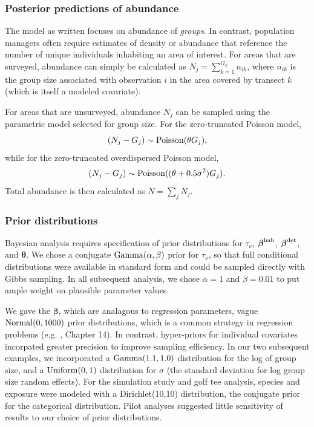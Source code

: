 \documentclass[10pt]{article}
\begin{document}
\subsubsection*{Posterior predictions of abundance}

The model as written focuses on abundance of \emph{groups}.  In contrast, population managers often require estimates of density or abundance that reference the number of unique individuals inhabiting an area of interest.  For areas that are surveyed, abundance can simply be calculated as $N_j=\sum_{k=1}^{G_k} n_{ik}$, where $n_{ik}$ is the group size associated with observation $i$ in the area covered by transect $k$ (which is itself a modeled covariate).

For areas that are unsurveyed, abundance $N_j$ can be sampled using the parametric model selected for group size.  For the zero-truncated Poisson model,
$$(N_j-G_j) \sim {\rm Poisson}(\theta G_j),
$$
while for the zero-truncated overdispersed Poisson model,
$$(N_j-G_j) \sim {\rm Poisson}((\theta+0.5\sigma^2) G_j).$$
Total abundance is then calculated as $N=\sum_j N_j$.

\subsubsection*{Prior distributions}

Bayesian analysis requires specification of prior distributions for $\tau_\nu$, $\boldsymbol{\beta}^{\rm hab}$, $\boldsymbol{\beta}^{\rm det}$, and $\boldsymbol{\theta}$.  We chose a conjugate ${\rm Gamma}(\alpha,\beta)$ prior for $\tau_\nu$, so that full conditional distributions were available in standard form and could be sampled directly with Gibbs sampling. In all subsequent analysis, we chose $\alpha=1$ and $\beta=0.01$ to put ample weight on plausible parameter values.

We gave the $\boldsymbol{\beta}$, which are analagous to regression parameters, vague ${\rm Normal}(0,1000)$ prior distributions, which is a common strategy in regression problems (e.g. \cite{GelmanEtAl2004}, Chapter 14).  In contrast, hyper-priors for individual covariates incorpated greater precision to improve sampling efficiency.  In our two subsequent examples, we incorporated a ${\rm Gamma}(1.1,1.0)$ distribution for the log of group size, and a ${\rm Uniform}(0,1)$ distribution for $\sigma$ (the standard deviation for log group size random effects). For the simulation study and golf tee analysis, species and exposure were modeled with a Dirichlet(10,10) distribution, the conjugate prior for the categorical distribution.  Pilot analyses suggested little sensitivity of results to our choice of prior distributions.
\end{document}
